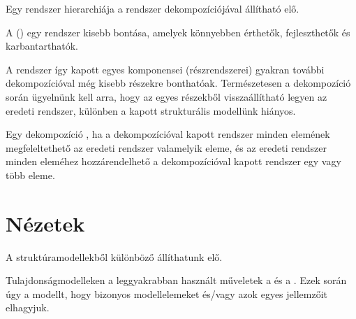 Egy rendszer hierarchiája a rendszer dekompozíciójával állítható elő.

\begin{definicio}
	A  () egy rendszer kisebb  bontása, amelyek könnyebben érthetők, fejleszthetők és karbantarthatók.
\end{definicio}

A rendszer így kapott egyes komponensei (részrendszerei) gyakran további dekompozícióval még kisebb részekre bonthatóak. Természetesen a dekompozíció során ügyelnünk kell arra, hogy az egyes részekből visszaállítható legyen az eredeti rendszer, különben a kapott strukturális modellünk hiányos.

\begin{definicio}
	Egy dekompozíció , ha a dekompozícióval kapott rendszer minden elemének megfeleltethető az eredeti rendszer valamelyik eleme, és az eredeti rendszer minden eleméhez hozzárendelhető a dekompozícióval kapott rendszer egy vagy több eleme.
\end{definicio}
















\section{Nézetek}

A struktúramodellekből különböző  állíthatunk elő. 

Tulajdonságmodelleken a leggyakrabban használt műveletek a  és a . Ezek során úgy  a modellt, hogy bizonyos modellelemeket és/vagy azok egyes jellemzőit elhagyjuk.

